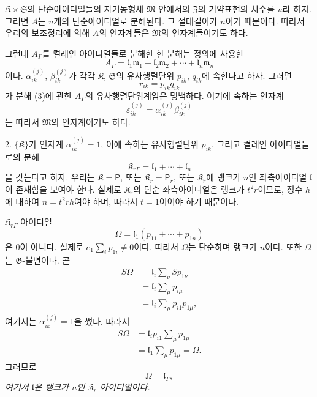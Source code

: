 \(\mathfrak K\times\mathfrak S\)의 단순아이디얼들의 자기동형체 \(\mathfrak M\) 안에서의 \(\mathfrak Z\)의 기약표현의 차수를 \(u\)라 하자. 그러면 \(A\)는 \(u\)개의 단순아이디얼로 분해된다. 그 절대길이가 \(n\)이기 때문이다. 따라서 우리의 보조정리에 의해 \(A\)의 인자계들은 \(\mathfrak M\)의 인자계들이기도 하다.

그런데 \(A_\Gamma\)를 켤레인 아이디얼들로 분해한 한 분해는 정의에 사용한
\[
\tag{3}
        A_\Gamma
        =\mathfrak l_1\mathfrak m_1+
         \mathfrak l_2\mathfrak m_2+
         \cdots+
         \mathfrak l_n\mathfrak m_n
\]
이다. \(\alpha_{ik}^{(j)}\), \(\beta_{ik}^{(j)}\)가 각각 \(\mathfrak K\), \(\mathfrak S\)의 유사행렬단위 \(p_{ik}\), \(q_{ik}\)에 속한다고 하자. 그러면
\[
        r_{ik}=p_{ik}q_{ik}
\]
가 분해 (3)에 관한 \(A_\Gamma\)의 유사행렬단위계임은 명백하다. 여기에 속하는 인자계
\[
        \varepsilon_{ik}^{(j)}
        =\alpha_{ik}^{(j)}\beta_{ik}^{(j)}
\]
는 따라서 \(\mathfrak M\)의 인자계이기도 하다.

2. \(\{\mathfrak K\}\)가 인자계 \(\alpha_{ik}^{(j)}=1\), 이에 속하는 유사행렬단위 \(p_{ik}\), 그리고 켤레인 아이디얼들로의 분해
\[
        \mathfrak K_{r\Gamma}
        =\mathfrak l_1+\cdots+\mathfrak l_n
\]
을 갖는다고 하자. 우리는 \(\mathfrak K=\mathsf P\), 또는 \(\mathfrak K_r=\mathsf P_r\), 또는 \(\mathfrak K_r\)에 랭크가 \(n\)인 좌측아이디얼 \(\mathfrak l\)이 존재함을 보여야 한다. 실제로 \(\mathfrak K_r\)의 단순 좌측아이디얼은 랭크가 \(t^2r\)이므로, 정수 \(h\)에 대하여 \(n=t^2rh\)여야 하며, 따라서 \(t=1\)이어야 하기 때문이다.

\(\mathfrak K_{r\Gamma}\)-아이디얼
\[
        \Omega
        =\mathfrak l_1(p_{11}+\cdots+p_{1n})
\]
은 \(0\)이 아니다. 실제로 \(e_1\sum_i p_{1i}\ne0\)이다. 따라서 \(\Omega\)는 단순하며 랭크가 \(n\)이다. 또한 \(\Omega\)는 \(\mathfrak G\)-불변이다. 곧
\[
\begin{aligned}
S\Omega
 &=\mathfrak l_i\sum_\nu S p_{1\nu}\\
 &=\mathfrak l_i\sum_\mu p_{i\mu}\\
 &=\mathfrak l_i\sum_\mu p_{i1}p_{1\mu},
\end{aligned}
\]
여기서는 \(\alpha_{ik}^{(j)}=1\)을 썼다. 따라서
\[
\begin{aligned}
S\Omega
 &=\mathfrak l_ip_{i1}\sum_\mu p_{1\mu}\\
 &=\mathfrak l_1\sum_\mu p_{1\mu}
  =\Omega.
\end{aligned}
\]
그러므로
\[
        \Omega=\mathfrak l_\Gamma,
\]
\emph{여기서 \(\mathfrak l\)은 랭크가 \(n\)인 \(\mathfrak K_r\)-아이디얼이다.}

